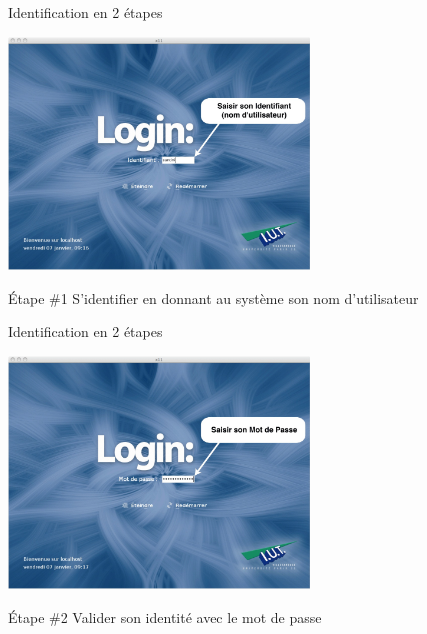 \begin{frame}{Identification en 2 étapes}
  \begin{center}
    \includegraphics[width=8cm]{img/s01/linux_login.jpg}
  \end{center}
  \begin{block}{Étape \#1}
    S'identifier en donnant au système son nom d'utilisateur
  \end{block}
\end{frame}
\begin{frame}{Identification en 2 étapes}
  \begin{center}
    \includegraphics[width=8cm]{img/s01/linux_passwd.jpg}
  \end{center}
  \begin{block}{Étape \#2}
    Valider son identité avec le mot de passe
  \end{block}
\end{frame}

